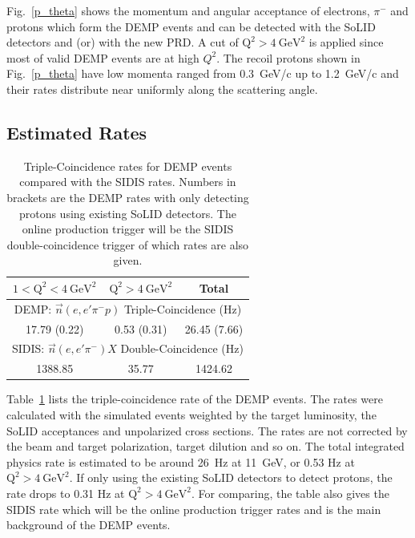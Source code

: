 Fig.~\ref{p_theta} shows the momentum and angular acceptance of electrons,
$\pi^{-}$ and protons which form the DEMP events and can be detected with the
SoLID detectors and (or) with the new PRD.  A cut of $\mathrm{Q^{2}>4~GeV^{2}}$
is applied since most of valid DEMP events are at high $Q^{2}$. The recoil
protons shown in Fig.~\ref{p_theta} have low momenta ranged from 0.3~GeV/c up
to 1.2~GeV/c and their rates distribute near uniformly along the scattering
angle.

\subsection{Estimated Rates}

\begin{table}[!ht]
\centering
\begin{tabular}{|c|c|c|}
 \hline
  $\mathrm{1<Q^{2}<4~GeV^{2}}$ & $\mathrm{Q^{2}>4~GeV^{2}}$ & Total\\
 \hline
\multicolumn{3}{|c|}{DEMP: $\vec{n}(e,e'\pi^{-}p)$ Triple-Coincidence (Hz)}\\
 \hline
 17.79 (0.22)   &  0.53 (0.31) & 26.45 (7.66)   \\
 \hline
\multicolumn{3}{|c|}{SIDIS: $\vec{n}(e,e'\pi^{-})X$ Double-Coincidence (Hz)}                                     \\
 \hline
        1388.85 & 35.77        & 1424.62   \\
 \hline
\end{tabular}
\caption[Triple-Coincidence rates for
  neutron-DEMP]{\footnotesize{Triple-Coincidence rates for DEMP events compared
    with the SIDIS rates. Numbers in brackets are the DEMP rates with only
    detecting protons using existing SoLID detectors. The online production
    trigger will be the SIDIS double-coincidence trigger of which rates are
    also given.}}
\label{rate_table}
\end{table} 
Table~\ref{rate_table} lists the triple-coincidence rate of the DEMP
events. The rates were calculated with the simulated events weighted by the
target luminosity, the SoLID acceptances and unpolarized cross sections. The rates are not corrected by the beam and target
polarization, target dilution and so on. The total integrated physics rate is
estimated to be around 26~Hz at 11~GeV, or 0.53 Hz at
$\mathrm{Q^{2}>4~GeV^{2}}$. If only using the existing SoLID detectors to
detect protons, the rate drops to 0.31 Hz at $\mathrm{Q^{2}>4~GeV^{2}}$.  For
comparing, the table also gives the SIDIS rate which will be the online
production trigger rates and is the main background of the DEMP events.

